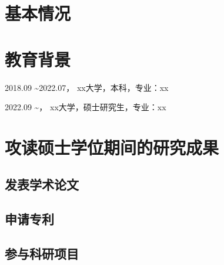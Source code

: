\section{基本情况}

\section{教育背景}
2018.09 \textasciitilde 2022.07， xx大学，本科，专业：xx 

2022.09 \textasciitilde \qquad\quad\;， xx大学，硕士研究生，专业：xx 

\section{攻读硕士学位期间的研究成果}
\subsection{发表学术论文}

\subsection{申请专利}

\subsection{参与科研项目}

